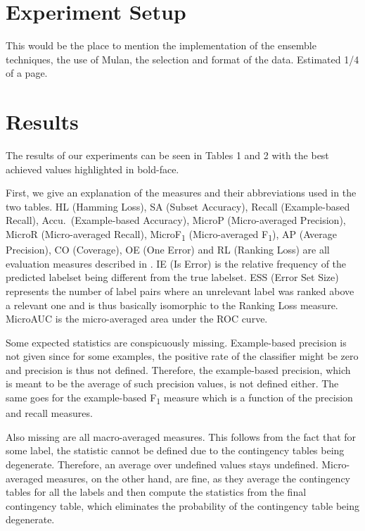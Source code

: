 \section{Experiment Setup}
This would be the place to mention the implementation of the ensemble
techniques, the use of Mulan, the selection and format of the data. Estimated
1/4 of a page.

\section{Results}




The results of our experiments can be seen in Tables 1 and 2 with the
best achieved values highlighted in bold-face.

First, we give an explanation of the measures and their abbreviations
used in the two tables. HL (Hamming Loss), SA (Subset Accuracy),
Recall (Example-based Recall), Accu.\ (Example-based Accuracy), MicroP
(Micro-averaged Precision), MicroR (Micro-averaged Recall),
MicroF\textsubscript{1} (Micro-averaged F\textsubscript{1}), AP
(Average Precision), CO (Coverage), OE (One Error) and RL (Ranking
Loss) are all evaluation measures described in \cite{MLLSlides}. IE
(Is Error) is the relative frequency of the predicted labelset being
different from the true labelset. ESS (Error Set Size) represents the
number of label pairs where an unrelevant label was ranked above a
relevant one and is thus basically isomorphic to the Ranking Loss
measure. MicroAUC is the micro-averaged area under the ROC curve.

Some expected statistics are conspicuously missing. Example-based
precision is not given since for some examples, the positive rate of
the classifier might be zero and precision is thus not
defined. Therefore, the example-based precision, which is meant to be
the average of such precision values, is not defined either. The same
goes for the example-based F\textsubscript{1} measure which is a
function of the precision and recall measures.

Also missing are all macro-averaged measures. This follows from the
fact that for some label, the statistic cannot be defined due to the
contingency tables being degenerate. Therefore, an average over
undefined values stays undefined. Micro-averaged measures, on the
other hand, are fine, as they average the contingency tables for all
the labels and then compute the statistics from the final contingency
table, which eliminates the probability of the contingency table being
degenerate.

